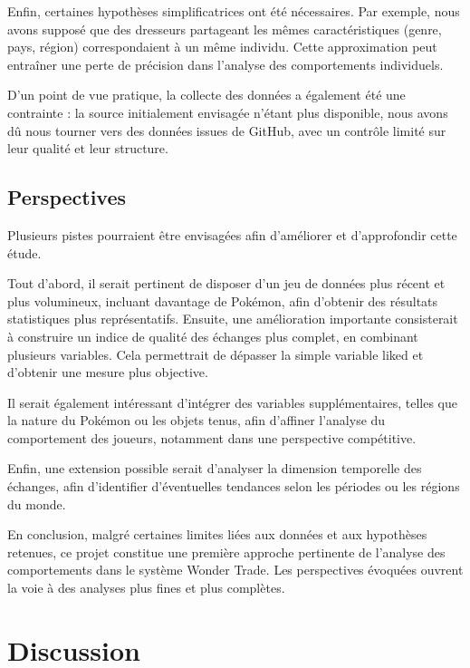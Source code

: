 \documentclass[mstat,12pt]{unswthesis}
\begin{document}
\medskip

Enfin, certaines hypothèses simplificatrices ont été nécessaires. Par
exemple, nous avons supposé que des dresseurs partageant les mêmes
caractéristiques (genre, pays, région) correspondaient à un même
individu. Cette approximation peut entraîner une perte de précision dans
l'analyse des comportements individuels.

\medskip

D'un point de vue pratique, la collecte des données a également été une
contrainte : la source initialement envisagée n'étant plus disponible,
nous avons dû nous tourner vers des données issues de GitHub, avec un
contrôle limité sur leur qualité et leur structure.

\section{Perspectives}\label{perspectives}

Plusieurs pistes pourraient être envisagées afin d'améliorer et
d'approfondir cette étude.

\medskip

Tout d'abord, il serait pertinent de disposer d'un jeu de données plus
récent et plus volumineux, incluant davantage de Pokémon, afin d'obtenir
des résultats statistiques plus représentatifs. Ensuite, une
amélioration importante consisterait à construire un indice de qualité
des échanges plus complet, en combinant plusieurs variables. Cela
permettrait de dépasser la simple variable liked et d'obtenir une mesure
plus objective.

\medskip

Il serait également intéressant d'intégrer des variables
supplémentaires, telles que la nature du Pokémon ou les objets tenus,
afin d'affiner l'analyse du comportement des joueurs, notamment dans une
perspective compétitive.

Enfin, une extension possible serait d'analyser la dimension temporelle
des échanges, afin d'identifier d'éventuelles tendances selon les
périodes ou les régions du monde.

\bigskip

En conclusion, malgré certaines limites liées aux données et aux
hypothèses retenues, ce projet constitue une première approche
pertinente de l'analyse des comportements dans le système Wonder Trade.
Les perspectives évoquées ouvrent la voie à des analyses plus fines et
plus complètes.

\chapter{Discussion}\label{discussion}
\end{document}
